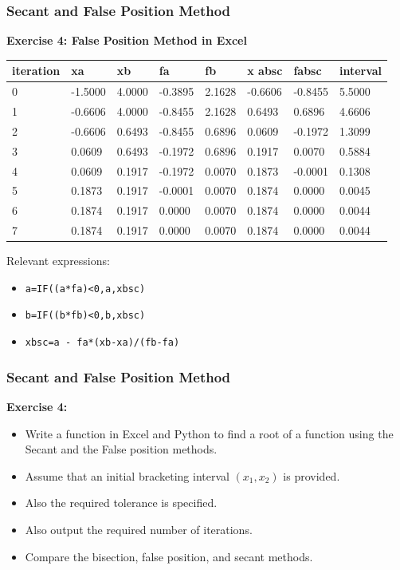 \begin{frame}[fragile]
    \frametitle{Secant and False Position Method}

    \textbf{Exercise 4: False Position Method in Excel}
    \begin{table}[]
      \begin{tabular}{|l|l|l|l|l|l|l|l|}
      \hline
      iteration & xa      & xb     & fa      & fb     & x absc  & fabsc   & interval \\ \hline
      0         & -1.5000 & 4.0000 & -0.3895 & 2.1628 & -0.6606 & -0.8455 & 5.5000   \\ \hline
      1         & -0.6606 & 4.0000 & -0.8455 & 2.1628 & 0.6493  & 0.6896  & 4.6606   \\ \hline
      2         & -0.6606 & 0.6493 & -0.8455 & 0.6896 & 0.0609  & -0.1972 & 1.3099   \\ \hline
      3         & 0.0609  & 0.6493 & -0.1972 & 0.6896 & 0.1917  & 0.0070  & 0.5884   \\ \hline
      4         & 0.0609  & 0.1917 & -0.1972 & 0.0070 & 0.1873  & -0.0001 & 0.1308   \\ \hline
      5         & 0.1873  & 0.1917 & -0.0001 & 0.0070 & 0.1874  & 0.0000  & 0.0045   \\ \hline
      6         & 0.1874  & 0.1917 & 0.0000  & 0.0070 & 0.1874  & 0.0000  & 0.0044   \\ \hline
      7         & 0.1874  & 0.1917 & 0.0000  & 0.0070 & 0.1874  & 0.0000  & 0.0044   \\ \hline
      \end{tabular}
      \end{table}
    Relevant expressions: 
    \begin{itemize}
      \item \texttt{a=IF((a*fa)<0,a,xbsc)}
      \item \texttt{b=IF((b*fb)<0,b,xbsc)}
      \item \texttt{xbsc=a - fa*(xb-xa)/(fb-fa)}
    \end{itemize}
\end{frame}

\begin{frame}[fragile]
    \frametitle{Secant and False Position Method}

    \textbf{Exercise 4:}
    \begin{itemize}
        \item Write a function in Excel and Python to find a root of a function using the Secant and the False position methods.
        \item Assume that an initial bracketing interval \((x_1, x_2)\) is provided.
        \item Also the required tolerance is specified.
        \item Also output the required number of iterations.
        \item Compare the bisection, false position, and secant methods.
    \end{itemize}
\end{frame}


